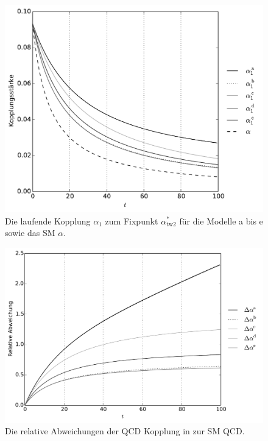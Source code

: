 \begin{figure}[h]
  \centering
  \includegraphics[scale=0.7]{Python/plots/alpha_running/Kopplungen1_her.pdf}
  \caption{Die laufende Kopplung $\alpha_1$ zum Fixpunkt $\alpha^*_\text{tw2}$ für die  Modelle a bis e sowie 
  das SM $\alpha$.}
  \label{fig:messbarkeit:alpha_running_afix2}
\end{figure}

\begin{figure}
  \centering
  \includegraphics[scale=0.7]{Python/plots/alpha_running/relative_deviation_her.pdf}
  \caption{Die relative Abweichungen der QCD Kopplung in 
  \QCDxdQCD zur SM QCD.}
  \label{fig:messbarkeit:relative_deviation}
\end{figure}
